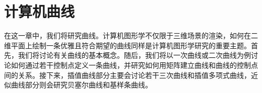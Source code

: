 \chapter{计算机曲线}

在这一章中，我们将研究曲线。计算机图形学不仅限于三维场景的渲染，如何在二维平面上绘制一条优雅且符合期望的曲线同样是计算机图形学研究的重要主题。首先，我们将讨论有关曲线的基本概念。随后，我们将以一次曲线或二次曲线为例讨论如何通过若干控制点定义一条曲线，并研究如何用矩阵建立曲线和曲线的控制点间的关系。接下来，插值曲线部分主要会讨论若干三次曲线和插值多项式曲线，近似曲线部分则会研究贝塞尔曲线和基样条曲线。




% 